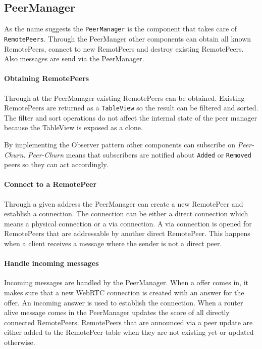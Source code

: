 \subsection{PeerManager}\label{sec:mit-peerManager}
As the name suggests the \lstinline|PeerManager| is the component that takes care of \lstinline|RemotePeers|. Through the PeerManger other components can obtain all known RemotePeers, connect to new RemotPeers and destroy existing RemotePeers. Also messages are send via the PeerManager.

\paragraph{Obtaining RemotePeers} \label{paragraph:obtain-remotepeers}
Through at the PeerManager existing RemotePeers can be obtained. Existing RemotePeers are returned as a \lstinline|TableView| so the result can be filtered and sorted. The filter and sort operations do not affect the internal state of the peer manager because the TableView is exposed as a clone. 

By implementing the Observer pattern other components can subscribe on \textit{Peer-Churn}. \textit{Peer-Churn} means that subscribers are notified about \lstinline|Added| or \lstinline|Removed| peers so they can act accordingly.

\paragraph{Connect to a RemotePeer}
Through a given address the PeerManager can create a new RemotePeer and establish a connection. The connection can be either a direct connection which means a physical connection or a via connection. A via connection is opened for RemotePeers that are addressable by another direct RemotePeer. This happens when a client receives a message where the sender is not a direct peer.

\paragraph{Handle incoming messages}
\begin{itemize}
     Incoming \connectionNegotiation messages are handled by the PeerManager. When a offer comes in, it makes sure that a new WebRTC connection is created with an answer for the offer. An incoming answer is used to establish the connection.
     When a router alive message comes in the PeerManager updates the score of all directly connected RemotePeers.
     RemotePeers that are announced via a peer update are either added to the RemotePeer table when they are not existing yet or updated otherwise.
\end{itemize}

